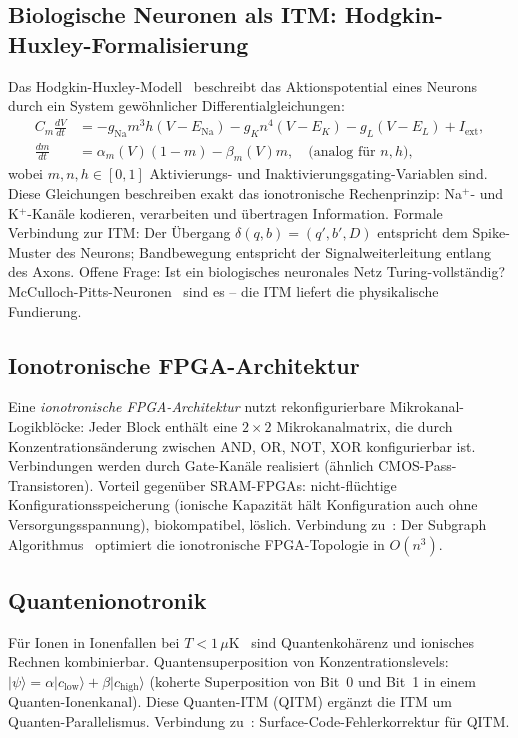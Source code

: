 ﻿\documentclass[a4paper,12pt]{article}
\theoremstyle{plain}
\theoremstyle{definition}
\theoremstyle{remark}
\begin{document}
\subsection{Biologische Neuronen als ITM: Hodgkin-Huxley-Formalisierung}

Das Hodgkin-Huxley-Modell~\cite{hodgkin1952} beschreibt das Aktionspotential
eines Neurons durch ein System gew\"ohnlicher Differentialgleichungen:
\begin{align*}
C_m \frac{dV}{dt} &= -g_{\mathrm{Na}} m^3 h (V - E_{\mathrm{Na}})
                     -g_K n^4 (V - E_K) - g_L (V - E_L) + I_{\mathrm{ext}},\\
\frac{dm}{dt} &= \alpha_m(V)(1-m) - \beta_m(V)m, \quad \text{(analog f\"ur } n, h\text{)},
\end{align*}
wobei $m, n, h \in [0,1]$ Aktivierungs- und Inaktivierungsgating-Variablen sind.
Diese Gleichungen beschreiben exakt das ionotronische Rechenprinzip:
Na$^+$- und K$^+$-Kan\"ale kodieren, verarbeiten und \"ubertragen Information.
Formale Verbindung zur ITM: Der \"Ubergang $\delta(q, b) = (q', b', D)$
entspricht dem Spike-Muster des Neurons;
Bandbewegung entspricht der Signalweiterleitung entlang des Axons.
Offene Frage: Ist ein biologisches neuronales Netz Turing-vollst\"andig?
McCulloch-Pitts-Neuronen~\cite{mcculloch1943} sind es -- die ITM
liefert die physikalische Fundierung.

\subsection{Ionotronische FPGA-Architektur}

Eine \emph{ionotronische FPGA-Architektur} nutzt rekonfigurierbare
Mikrokanal-Logikblöcke:
Jeder Block enth\"alt eine $2 \times 2$ Mikrokanalmatrix, die durch Konzentrations\"anderung
zwischen AND, OR, NOT, XOR konfigurierbar ist.
Verbindungen werden durch Gate-Kan\"ale realisiert (\"ahnlich CMOS-Pass-Transistoren).
Vorteil gegen\"uber SRAM-FPGAs: nicht-fl\"uchtige Konfigurationsspeicherung
(ionische Kapazit\"at h\"alt Konfiguration auch ohne Versorgungsspannung),
biokompatibel, l\"oslich.
Verbindung zu~\cite{epp2026fpga}: Der Subgraph Algorithmus~\cite{epp2026subgraph}
optimiert die ionotronische FPGA-Topologie in $O(n^3)$.

\subsection{Quantenionotronik}

F\"ur Ionen in Ionenfallen bei $T < 1\,\mu$K~\cite{cirac1995} sind
Quantenkoh\"arenz und ionisches Rechnen kombinierbar.
Quantensuperposition von Konzentrationslevels:
$|\psi\rangle = \alpha|c_{\mathrm{low}}\rangle + \beta|c_{\mathrm{high}}\rangle$
(koherte Superposition von Bit~0 und Bit~1 in einem Quanten-Ionenkanal).
Diese Quanten-ITM (QITM) erg\"anzt die ITM um Quanten-Parallelismus.
Verbindung zu~\cite{epp2026qecc}: Surface-Code-Fehlerkorrektur f\"ur QITM.
\end{document}
